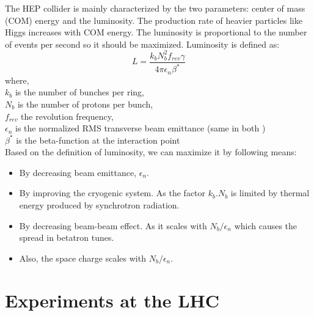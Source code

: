 The HEP collider is mainly characterized by the two parameters: center of mass (COM) energy and the luminosity. The production rate of heavier particles like Higgs increases with COM energy. The luminosity is proportional to the number of events per second so it should be maximized. Luminosity is defined as:
\begin{equation}
    L = \frac{k_bN_b^2f_{rev}\gamma}{4 \pi \epsilon_n \beta^*}
\end{equation}
where,\\
\hspace{2cm}$k_b$ is the number of bunches per ring,\\
\hspace{2cm}$N_b$ is the number of protons per bunch,\\
\hspace{2cm}$f_{rev}$ the revolution frequency,\\
\hspace{2cm}$\epsilon_n$ is the normalized RMS transverse beam emittance (same in both )\\
\hspace{2cm}$\beta^*$ is the beta-function at the interaction point\\

Based on the definition of luminosity, we can maximize it by following means:
\begin{itemize}
    \item By decreasing beam emittance, $\epsilon_n$.
    \item By improving the cryogenic system. As the factor $k_b.N_b$ is limited by thermal energy produced by synchrotron radiation.
    \item By decreasing beam-beam effect. As it scales with $N_b/ \epsilon_n$ which causes the spread in betatron tunes.
    \item Also, the space charge  scales with $N_b/ \epsilon_n$.
\end{itemize}


\section{Experiments at the LHC} %
\label{sec:experiments_at_the_lhc}

